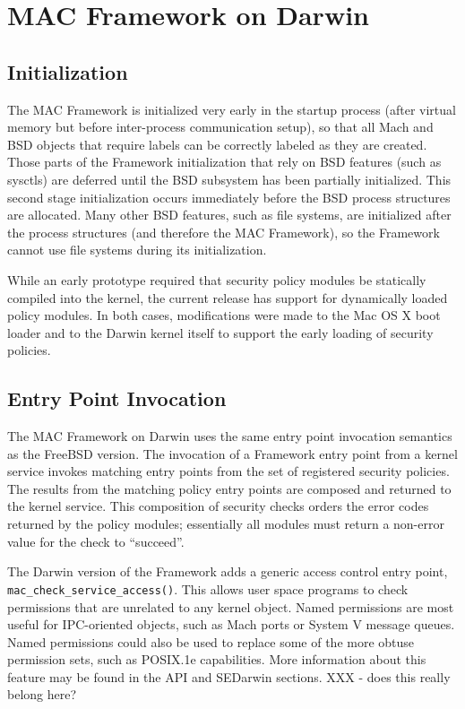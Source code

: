 \section{MAC Framework on Darwin}

\subsection{Initialization}

The MAC Framework is initialized very early in the startup process
(after virtual memory but before inter-process communication setup),
so that all Mach and BSD objects that require labels can be correctly
labeled as they are created.  Those parts of the Framework
initialization that rely on BSD features (such as sysctls) are
deferred until the BSD subsystem has been partially initialized.
This second stage initialization occurs immediately before the BSD
process structures are allocated.  Many other BSD features, such
as file systems, are initialized after the process structures (and
therefore the MAC Framework), so the Framework cannot use file
systems during its initialization.

While an early prototype required that security policy modules be
statically compiled into the kernel, the current release has support
for dynamically loaded policy modules.  In both cases, modifications
were made to the Mac OS X boot loader and to the Darwin kernel
itself to support the early loading of security policies.


\subsection{Entry Point Invocation}

The MAC Framework on Darwin uses the same entry point invocation
semantics as the FreeBSD version.  The invocation of a Framework
entry point from a kernel service invokes matching entry points
from the set of registered security policies.  The results from the
matching policy entry points are composed and returned to the kernel
service.  This composition of security checks orders the error codes
returned by the policy modules; essentially all modules must return
a non-error value for the check to ``succeed''.

The Darwin version of the Framework adds a generic access control
entry point, {\tt mac\_check\_service\_access()}. This allows
user space programs to check permissions that are unrelated to any
kernel object.  Named permissions are most useful for IPC-oriented
objects, such as Mach ports or System V message queues. Named
permissions could also be used to replace some of the more obtuse
permission sets, such as POSIX.1e capabilities. More information
about this feature may be found in the API and SEDarwin sections.
XXX - does this really belong here?

